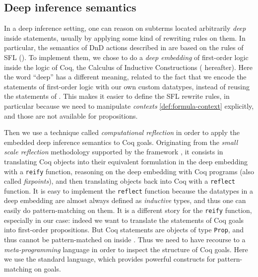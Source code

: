 \subsection{Deep inference semantics}

In a deep inference setting, one can reason on subterms located arbitrarily
\emph{deep} inside statements, usually by applying some kind of rewriting rules
on them. In particular, the semantics of DnD actions described in 
are based on the rules of SFL (). To implement them, we chose to do
a \emph{deep embedding} of first-order logic inside the logic of Coq, the
Calculus of Inductive Constructions ( hereafter). Here the word
``deep'' has a different meaning, related to the fact that we encode the
statements of first-order logic with our own custom datatypes, instead of
reusing the statements of . This makes it easier to define the SFL
rewrite rules, in particular because we need to manipulate \emph{contexts}
\ref{def:formula-context} explicitly, and those are not available for 
propositions.

Then we use a technique called \emph{computational reflection} in order to apply
the embedded deep inference semantics to Coq goals. Originating from the
\emph{small scale reflection} methodology supported by the {\ssreflect}
framework \cite{SSR}, it consists in translating Coq objects into their
equivalent formulation in the deep embedding with a \texttt{reify} function,
reasoning on the deep embedding with Coq programs (also called
\emph{fixpoints}), and then translating objects back into Coq with a
\texttt{reflect} function. It is easy to implement the \texttt{reflect} function
because the datatypes in a deep embedding are almost always defined as
\emph{inductive} types, and thus one can easily do pattern-matching on them. It
is a different story for the \texttt{reify} function, especially in our case:
indeed we want to translate the statements of Coq goals into first-order
propositions. But Coq statements are objects of type \texttt{Prop}, and thus
cannot be pattern-matched on inside . Thus we
need to have recourse to a \emph{meta-programming} language in order to inspect
the structure of Coq goals. Here we use the standard {\ltac} language, which
provides powerful constructs for pattern-matching on goals.

